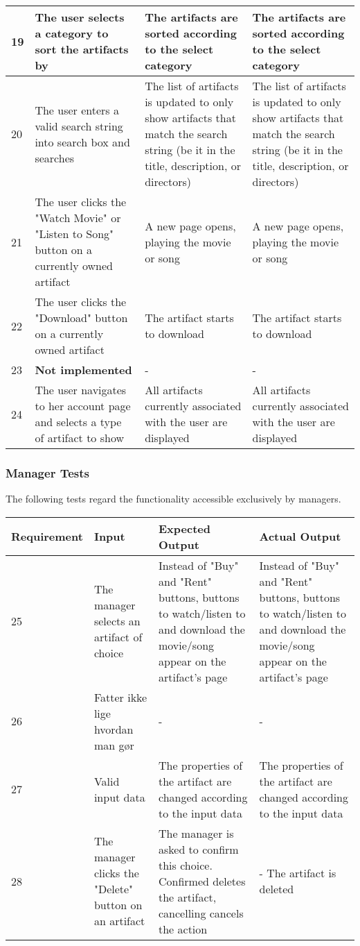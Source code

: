 {{\begin{tabular}{ | p{2cm} | p{3cm} | p{4cm} | p{4cm} | }
	\hline
	19 & The user selects a category to sort the artifacts by & The artifacts are sorted according to the select category & The artifacts are sorted according to the select category \\
	\hline
	20 & The user enters a valid search string into search box and searches & The list of artifacts is updated to only show artifacts that match the search string (be it in the title, description, or directors) & The list of artifacts is updated to only show artifacts that match the search string (be it in the title, description, or directors) \\
	\hline
	21 & The user clicks the "Watch Movie" or "Listen to Song" button on a currently owned artifact & A new page opens, playing the movie or song & A new page opens, playing the movie or song \\
	\hline
	22 & The user clicks the "Download" button on a currently owned artifact & The artifact starts to download & The artifact starts to download \\
	\hline
	23 & \textbf{Not implemented}  & - & - \\
	\hline
	24 & The user navigates to her account page and selects a type of artifact to show & All artifacts currently associated with the user are displayed & All artifacts currently associated with the user are displayed \\
	\hline
\end{tabular}}}

\subsubsection{Manager Tests}
The following tests regard the functionality accessible exclusively by managers. \\

{\centering
\scalebox{0.7}
{\begin{tabular}{ | p{2cm} | p{3cm} | p{4cm} | p{4cm} | }
	\hline
	Requirement & Input & Expected Output & Actual Output \\
	\hline
	25 & The manager selects an artifact of choice & Instead of "Buy" and "Rent" buttons, buttons to watch/listen to and download the movie/song appear on the artifact's page & Instead of "Buy" and "Rent" buttons, buttons to watch/listen to and download the movie/song appear on the artifact's page \\
	\hline
	26 & Fatter ikke lige hvordan man gør & - & - \\
	\hline
	27 & Valid input data & The properties of the artifact are changed according to the input data & The properties of the artifact are changed according to the input data \\
	\hline
	28 & The manager clicks the "Delete" button on an artifact & The manager is asked to confirm this choice. Confirmed deletes the artifact, cancelling cancels the action & - The artifact is deleted \\
	\hline
\end{tabular}}}